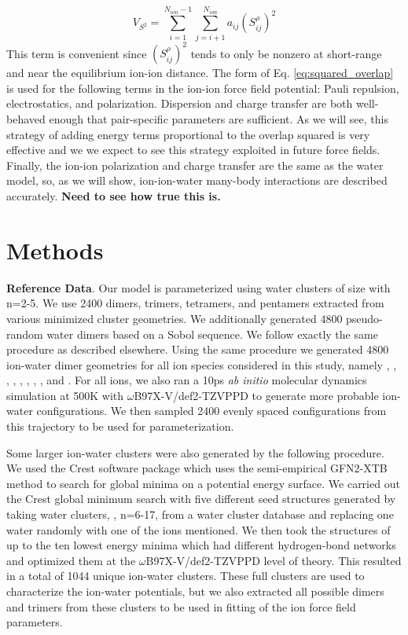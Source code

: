 \documentclass[journal=jctcce,manuscript=article]{achemso}
\begin{document}
\begin{equation}  V_{S^2}=\sum_{i=1}^{N_{ion}-1}\sum_{j=i+1}^{N_{ion}}a_{ij}(S_{ij}^\rho)^2
  \label{eq:squared_overlap}
\end{equation}
\noindent
This term is convenient since $(S_{ij}^\rho)^2$ tends to only be nonzero at short-range and near the equilibrium ion-ion distance. The form of Eq. \ref{eq:squared_overlap} is used for the following terms in the ion-ion force field potential: Pauli repulsion, electrostatics, and polarization. Dispersion and charge transfer are both well-behaved enough that pair-specific parameters are sufficient. As we will see, this strategy of adding energy terms proportional to the overlap squared is very effective and we we expect to see this strategy exploited in future force fields. Finally, the ion-ion polarization and charge transfer are the same as the water model, so, as we will show, ion-ion-water many-body interactions are described accurately. \textbf{Need to see how true this is.}

\section*{Methods}
\textbf{Reference Data}. Our model is parameterized using water clusters of size  with n=2-5. We use 2400 dimers, trimers, tetramers, and pentamers extracted from various minimized cluster geometries. We additionally generated 4800 pseudo-random water dimers based on a Sobol sequence. We follow exactly the same procedure as described elsewhere.\cite{misquitta2008first} Using the same procedure we generated 4800 ion-water dimer geometries for all ion species considered in this study, namely , , , , , , , , and . For all ions, we also ran a 10ps \textit{ab initio} molecular dynamics simulation at 500K with $\omega$B97X-V/def2-TZVPPD to generate more probable ion-water configurations. We then sampled 2400 evenly spaced configurations from this trajectory to be used for parameterization.

Some larger ion-water clusters were also generated by the following procedure. We used the Crest software package\cite{pracht2020automated} which uses the semi-empirical GFN2-XTB\cite{bannwarth2019gfn2} method to search for global minima on a potential energy surface. We carried out the Crest global minimum search with five different seed structures generated by taking water clusters, , n=6-17, from a water cluster database\cite{rakshit2019atlas} and replacing one water randomly with one of the ions mentioned. We then took the structures of up to the ten lowest energy minima which had different hydrogen-bond networks and optimized them at the $\omega$B97X-V/def2-TZVPPD level of theory. This resulted in a total of 1044 unique ion-water clusters. These full clusters are used to characterize the ion-water potentials, but we also extracted all possible dimers and trimers from these clusters to be used in fitting of the ion force field parameters.
\end{document}
